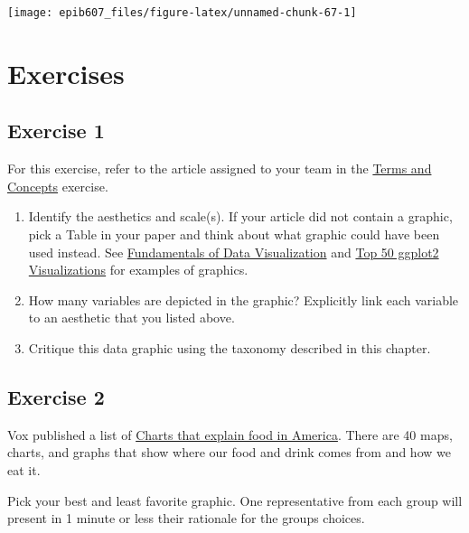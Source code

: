 \documentclass[]{book}
\providecommand{\tightlist}{%
  \setlength{\itemsep}{0pt}\setlength{\parskip}{0pt}}
\providecommand{\tightlist}{%
  \setlength{\itemsep}{0pt}\setlength{\parskip}{0pt}}
\theoremstyle{definition}
\theoremstyle{definition}
\theoremstyle{definition}
\theoremstyle{remark}
\begin{document}
\begin{center}\texttt{[image: epib607\_files/figure-latex/unnamed-chunk-67-1]} \end{center}

\section{Exercises}\label{exercises}

\subsection{Exercise 1}\label{exercise-1}

For this exercise, refer to the article assigned to your team in the
\href{https://sahirbhatnagar.com/EPIB607/terms-and-concepts.html}{Terms
and Concepts} exercise.

\begin{enumerate}
\def\labelenumi{\arabic{enumi}.}
\tightlist
\item
  Identify the aesthetics and scale(s). If your article did not contain
  a graphic, pick a Table in your paper and think about what graphic
  could have been used instead. See
  \href{https://serialmentor.com/dataviz/directory-of-visualizations.html}{Fundamentals
  of Data Visualization} and
  \href{http://r-statistics.co/Top50-Ggplot2-Visualizations-MasterList-R-Code.html\#1.\%20Correlation}{Top
  50 ggplot2 Visualizations} for examples of graphics.
\item
  How many variables are depicted in the graphic? Explicitly link each
  variable to an aesthetic that you listed above.
\item
  Critique this data graphic using the taxonomy described in this
  chapter.
\end{enumerate}

\subsection{Exercise 2}\label{exercise-2}

Vox published a list of
\href{http://www.vox.com/a/explain-food-america}{Charts that explain
food in America}. There are 40 maps, charts, and graphs that show where
our food and drink comes from and how we eat it.

Pick your best and least favorite graphic. One representative from each
group will present in 1 minute or less their rationale for the groups
choices.

\appendix
\end{document}
